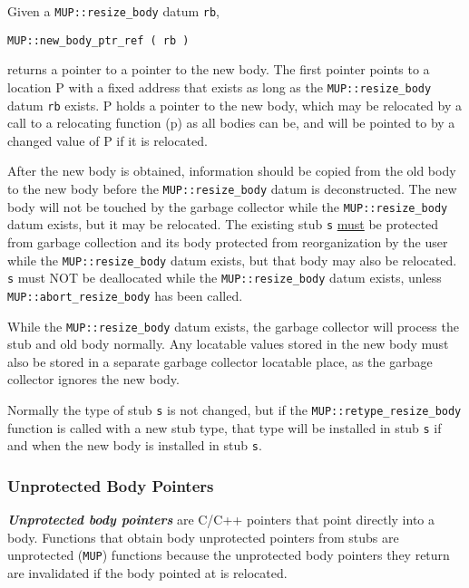 \documentclass[12pt]{article}
\newcommand{\ikey}[2]{{\bf \em #1}\index{#2}}
\newcommand{\pagref}[1]{p\pageref{#1}}
\newcommand{\EOL}{\penalty \exhyphenpenalty}
\begin{document}
Given a {\tt MUP::\EOL resize\_\EOL body} datum \verb|rb|,
\begin{center}
\verb|MUP::new_body_ptr_ref ( rb )|
\end{center}
returns a pointer to a pointer to the new body.  The first pointer
points to a location P with a fixed address that exists as long
as the {\tt MUP::\EOL resize\_\EOL body} datum \verb|rb| exists.   P holds
a pointer to the new body, which may be relocated by a call to
a relocating function (\pagref{RELOCATING-FUNCTIONS})
as all bodies
can be, and will be pointed to by a changed value of P if it is
relocated.

After the new body is obtained, information should be copied from
the old body to the new body before the {\tt MUP::\EOL resize\_\EOL body}
datum is deconstructed.  The new body will not be touched by
the garbage collector while the {\tt MUP::\EOL resize\_\EOL body} datum
exists, but it may be relocated.  The existing stub \verb|s|
\underline{must} be protected from garbage collection and
its body protected from reorganization by the user while the
{\tt MUP::\EOL resize\_\EOL body} datum exists, but that body may
also be relocated.  \verb|s| must NOT be deallocated
while the {\tt MUP::\EOL resize\_\EOL body} datum exists, unless
{\tt MUP::\EOL abort\_\EOL resize\_\EOL body} has been called.

While the {\tt MUP::\EOL resize\_\EOL body} datum exists,
the garbage collector will process the stub and old body normally.
Any locatable values stored in the new body must also be stored
in a separate garbage collector locatable place, as the garbage collector
ignores the new body.

Normally the type of stub \verb|s| is not changed, but
if the {\tt MUP::\EOL retype\_\EOL resize\_\EOL body} function is called
with a new stub type, that type will be installed in stub \verb|s|
if and when the new body is installed in stub \verb|s|.

\subsubsection{Unprotected Body Pointers}
\label{UNPROTECTED-BODY-POINTERS}

\ikey{Unprotected body pointers}{unprotected body pointer}%
are C/C++ pointers that point directly into a body.
Functions that obtain body unprotected
pointers from stubs are unprotected (\verb|MUP|) functions because
the unprotected body pointers they return are invalidated
if the body pointed at
is relocated.
\end{document}
